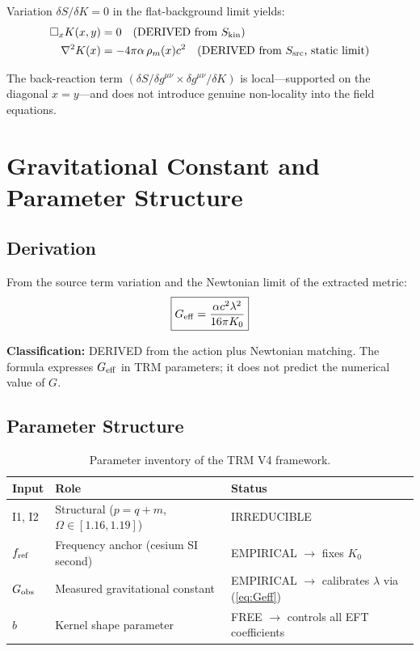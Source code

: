 \documentclass[12pt]{article}
\begin{document}
Variation $\delta S/\delta K = 0$ in the flat-background limit yields:
\begin{align}
\Box_x K(x,y) &= 0 \quad \text{(DERIVED from $S_{\rm kin}$)}
\label{eq:boxK} \\
\nabla^2 K(x) &= -4\pi\alpha\,\rho_m(x)c^2 \quad \text{(DERIVED from $S_{\rm src}$, static limit)}
\label{eq:poisson}
\end{align}

The back-reaction term $(\delta S/\delta g^{\mu\nu} \times \delta g^{\mu\nu}/\delta K)$ is local---supported on the diagonal $x=y$---and does not introduce genuine non-locality into the field equations.

\section{Gravitational Constant and Parameter Structure}
\label{sec:Geff}

\subsection{Derivation}

From the source term variation and the Newtonian limit of the extracted metric:
\begin{equation}
\boxed{G_{\rm eff} = \frac{\alpha c^2\lambda^2}{16\pi K_0}}
\label{eq:Geff}
\end{equation}

\textbf{Classification:} DERIVED from the action plus Newtonian matching. The formula expresses $G_{\rm eff}$ in TRM parameters; it does not predict the numerical value of $G$.

\subsection{Parameter Structure}

\begin{table}[h]
\centering
\begin{tabular}{l|l|l}
Input & Role & Status \\
\midrule
I1, I2 & Structural ($p=q+m$, $\Omega\in[1.16,1.19]$) & IRREDUCIBLE \\
$f_{\rm ref}$ & Frequency anchor (cesium SI second) & EMPIRICAL $\to$ fixes $K_0$ \\
$G_{\rm obs}$ & Measured gravitational constant & EMPIRICAL $\to$ calibrates $\lambda$ via (\ref{eq:Geff}) \\
$b$ & Kernel shape parameter & FREE $\to$ controls all EFT coefficients \\
\end{tabular}
\caption{Parameter inventory of the TRM V4 framework.}
\label{tab:params}
\end{table}
\end{document}
